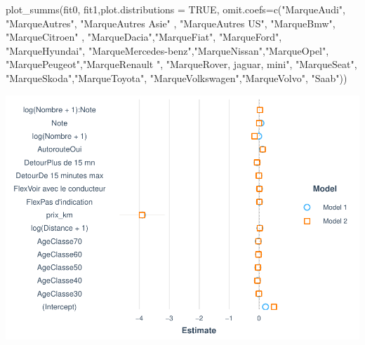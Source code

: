 \documentclass[
]{book}
\newenvironment{Shaded}{\begin{snugshade}}{\end{snugshade}}
\newcommand{\AttributeTok}[1]{\textcolor[rgb]{0.77,0.63,0.00}{#1}}
\newcommand{\ConstantTok}[1]{\textcolor[rgb]{0.00,0.00,0.00}{#1}}
\newcommand{\FunctionTok}[1]{\textcolor[rgb]{0.00,0.00,0.00}{#1}}
\newcommand{\NormalTok}[1]{#1}
\newcommand{\StringTok}[1]{\textcolor[rgb]{0.31,0.60,0.02}{#1}}
\begin{document}
\begin{Shaded}
\begin{Highlighting}[]
\FunctionTok{plot\_summs}\NormalTok{(fit0, fit1,}\AttributeTok{plot.distributions =} \ConstantTok{TRUE}\NormalTok{,  }
           \AttributeTok{omit.coefs=}\FunctionTok{c}\NormalTok{(}\StringTok{"MarqueAudi"}\NormalTok{, }
                        \StringTok{"MarqueAutres"}\NormalTok{, }
                        \StringTok{"MarqueAutres Asie"}\NormalTok{ ,}
                        \StringTok{"MarqueAutres US"}\NormalTok{,}
                        \StringTok{"MarqueBmw"}\NormalTok{,                }
                        \StringTok{"MarqueCitroen"}\NormalTok{ , }\StringTok{"MarqueDacia"}\NormalTok{,}\StringTok{"MarqueFiat"}\NormalTok{,}
                        \StringTok{"MarqueFord"}\NormalTok{,}
                        \StringTok{"MarqueHyundai"}\NormalTok{,}
                        \StringTok{"MarqueMercedes{-}benz"}\NormalTok{,}\StringTok{"MarqueNissan"}\NormalTok{,}\StringTok{"MarqueOpel"}\NormalTok{,}
                        \StringTok{"MarquePeugeot"}\NormalTok{,}\StringTok{"MarqueRenault "}\NormalTok{,}
                        \StringTok{"MarqueRover, jaguar, mini"}\NormalTok{,}
                        \StringTok{"MarqueSeat"}\NormalTok{,}
                        \StringTok{"MarqueSkoda"}\NormalTok{,}\StringTok{"MarqueToyota"}\NormalTok{,}
                        \StringTok{"MarqueVolkswagen"}\NormalTok{,}\StringTok{"MarqueVolvo"}\NormalTok{, }\StringTok{"Saab"}\NormalTok{))}
\end{Highlighting}
\end{Shaded}

\includegraphics{bookdown-demo_files/figure-latex/0910-1.pdf}
\end{document}
